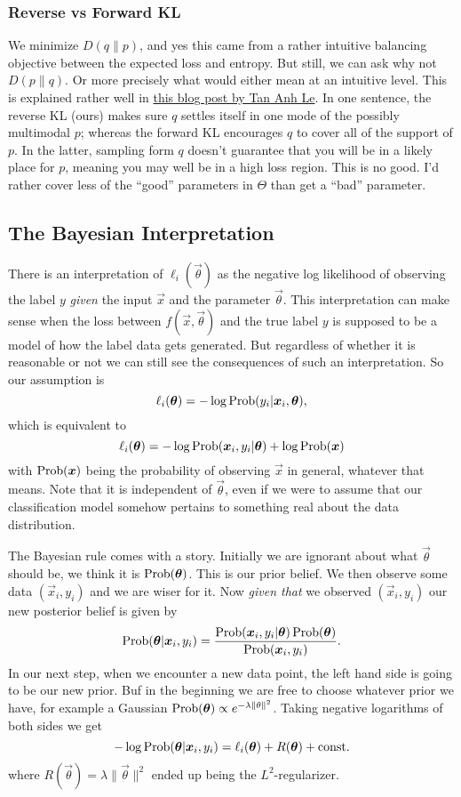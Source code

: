 \documentclass[12pt]{amsart}
\begin{document}
\subsubsection*{Reverse vs Forward KL}

We minimize $D(q\|p)$, and yes this came from a rather intuitive balancing objective between the expected loss and entropy. But still, we can ask why not $D(p\|q)$. Or more precisely what would either mean at an intuitive level. This is explained rather well in
\href{https://www.tuananhle.co.uk/notes/reverse-forward-kl.html}{this blog post by Tan Anh Le}. In one sentence, the reverse KL (ours) makes sure $q$ settles itself in one mode of the possibly multimodal $p$; whereas the forward KL encourages $q$ to cover all of the support of $p$. In the latter, sampling form $q$ doesn't guarantee that you will be in a likely place for $p$, meaning you may well be in a high loss region. This is no good. I'd rather cover less of the ``good'' parameters in $\Theta$ than get a ``bad'' parameter. 



\subsection*{The Bayesian Interpretation}

There is an interpretation of $\ell_i(\vec{\theta})$ as the negative log likelihood of observing  the label $y$ \emph{given} the input $\vec{x}$ and the parameter $\vec{\theta}$. This interpretation can make sense when the loss between $f(\vec{x}, \vec{\theta})$ and the true label $y$ is supposed to be a model of how the label data gets generated.  But regardless of whether it is reasonable or not we can still see the consequences of such an interpretation. So our assumption is 
\[
	\ell_i(\mathbf{\boldsymbol{\theta}}) = -\log \operatorname{Prob}(y_i | \mathbf{\boldsymbol{x}}_i, \mathbf{\boldsymbol{\theta}}),
\]
which is equivalent to 
\[	
\ell_i(\mathbf{\boldsymbol{\theta}}) = - \log \operatorname{Prob}(\mathbf{\boldsymbol{x}}_i, y_i | \mathbf{\boldsymbol{\theta}}) + \log \operatorname{Prob}(\mathbf{\boldsymbol{x}})
\]
with $\operatorname{Prob}(\mathbf{\boldsymbol{x}})$ being the probability of observing $\vec{x}$ in general, whatever that means. Note that it is independent of $\vec{\theta}$, even if we were to assume that our classification model somehow pertains to something real about the data distribution. 

The Bayesian rule comes with a story. Initially we are ignorant about what $\vec{\theta}$ should be, we think it is $\operatorname{Prob}(\mathbf{\boldsymbol{\theta}})$. This is our prior belief. We then observe some data $(\vec{x}_i, y_i)$ and we are wiser for it. Now \emph{given that} we observed $(\vec{x}_i, y_i)$ our new posterior belief is given by
\[
	\operatorname{Prob}(\mathbf{\boldsymbol{\theta}} | \mathbf{\boldsymbol{x}}_i, y_i) = \frac{\operatorname{Prob}(\mathbf{\boldsymbol{x}}_i, y_i| \mathbf{\boldsymbol{\theta}}) \operatorname{Prob}(\mathbf{\boldsymbol{\theta}})}{\operatorname{Prob}(\mathbf{\boldsymbol{x}}_i, y_i)}.
\]
In our next step, when we encounter a new data point, the left hand side is going to be our new prior. Buf in the beginning we are free to choose whatever prior we have, for example a Gaussian $\operatorname{Prob}(\mathbf{\boldsymbol{\theta}}) \propto e^{-\lambda\|\theta\|^2}$. Taking negative logarithms of both sides we get
\[
	-\log \operatorname{Prob}(\mathbf{\boldsymbol{\theta}} | \mathbf{\boldsymbol{x}}_i, y_i) = \ell_i(\mathbf{\boldsymbol{\theta}}) + R(\mathbf{\boldsymbol{\theta}}) + \text{const}.
\]
where $R(\vec{\theta})= \lambda\|\vec{\theta}\|^2$ ended up being the $L^2$-regularizer.
\end{document}
